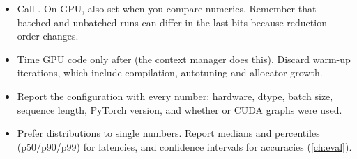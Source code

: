 \begin{itemize}
  \item Call . On GPU, also set
         when you compare numerics. Remember that
        batched and unbatched runs can differ in the last bits because reduction order changes.
  \item Time GPU code only after  (the 
        context manager does this). Discard warm-up iterations, which include compilation,
        autotuning and allocator growth.
  \item Report the configuration with every number: hardware, dtype, batch size, sequence
        length, PyTorch version, and whether  or CUDA graphs were used.
  \item Prefer distributions to single numbers. Report medians and percentiles (p50/p90/p99)
        for latencies, and confidence intervals for accuracies (\cref{ch:eval}).
\end{itemize}
